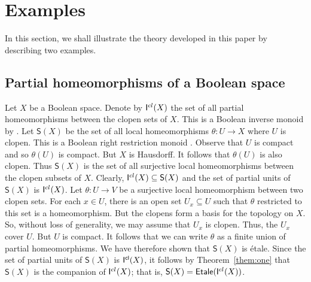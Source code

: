 \documentclass[a4paper]{amsart}
\begin{document}
\section{Examples}

In this section, we shall illustrate the theory developed in this paper by describing two examples.


\subsection{Partial homeomorphisms of a Boolean space}

Let $X$ be a Boolean space.
Denote by $\mathsf{I}^{\tiny cl}(X)$ the set of all partial homeomorphisms between the clopen sets of $X$.
This is a Boolean inverse monoid by \cite[Proposition 2.16, Proposition 5.2]{Lawson2016}.
Let  $\mathsf{S}(X)$ be the set of all local homeomorphisms $\theta \colon U \rightarrow X$
where $U$ is clopen.
This is a Boolean right restriction monoid \cite[Example 5.6]{Lawson2021b}.
Observe that $U$ is compact and so $\theta (U)$ is compact.
But $X$ is Hausdorff.
It follows that $\theta (U)$ is also clopen. 
Thus  $\mathsf{S}(X)$ is the set of all surjective local homeomorphisms
between the clopen subsets of $X$.
Clearly, $\mathsf{I}^{\tiny cl}(X) \subseteq \mathsf{S}(X)$ and
the set of partial units of $\mathsf{S}(X)$ is $\mathsf{I}^{\tiny cl}(X)$.
Let $\theta \colon U \rightarrow V$ be a surjective local homeomorphism
between two clopen sets.
For each $x \in U$, there is an open set $U_{x} \subseteq U$ such that
$\theta$ restricted to this set is a homeomorphism.
But the clopens form a basis for the topology on $X$.
So, without loss of generality, we may assume that $U_{x}$ is clopen.
Thus, the $U_{x}$ cover $U$.
But $U$ is compact.
It follows that we can write $\theta$ as a finite union of partial homeomorphisms.
We have therefore shown that $\mathsf{S}(X)$ is \'etale.
Since the set of partial units of $\mathsf{S}(X)$ is  $\mathsf{I^{\tiny cl}}(X)$,
it follows by Theorem~\ref{them:one} that  $\mathsf{S}(X)$ is the companion of  $\mathsf{I}^{\tiny cl}(X)$;
that is, $\mathsf{S}(X) = \mathsf{Etale}(\mathsf{I}^{\tiny cl}(X))$.
\end{document}
